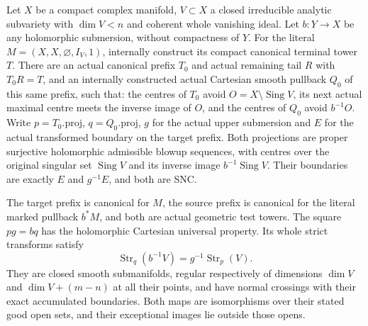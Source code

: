 \begin{theorem}
\label{hir:original-canonical-embedded-stopped-smooth-comparison}
\leanok
{}
Let $X$ be a compact complex manifold, $V\subset X$ a closed irreducible
analytic subvariety with $\dim V<n$ and coherent whole vanishing ideal.
Let $b:Y\to X$ be any holomorphic submersion, without compactness of $Y$.
For the literal $M=(X,X,\varnothing,I_V,1)$, internally construct its compact
canonical terminal tower $T$.  There are an actual canonical prefix $T_0$
and actual remaining tail $R$ with $T_0R=T$, and an internally constructed
actual Cartesian smooth pullback $Q_0$ of this same prefix, such that:
the centres of $T_0$ avoid $O=X\setminus\operatorname{Sing}V$, its next
actual maximal centre meets the inverse image of $O$, and the centres of
$Q_0$ avoid $b^{-1}O$.  Write $p=T_0.\mathrm{proj}$, $q=Q_0.\mathrm{proj}$,
$g$ for the actual upper submersion and $E$ for the actual transformed
boundary on the target prefix.  Both projections are proper surjective
holomorphic admissible blowup sequences, with centres over the original
singular set $\operatorname{Sing}V$ and its inverse image $b^{-1}\operatorname{Sing}V$.
Their boundaries are exactly $E$ and $g^{-1}E$, and both are SNC.

The target prefix is canonical for $M$, the source prefix is canonical
for the literal marked pullback $b^*M$, and both are actual geometric test
towers.  The square $pg=bq$ has the holomorphic Cartesian universal
property.  Its whole strict transforms satisfy
\[
 \operatorname{Str}_q(b^{-1}V)=g^{-1}\operatorname{Str}_p(V).
\]
They are closed smooth submanifolds, regular respectively of dimensions
$\dim V$ and $\dim V+(m-n)$ at all their points, and have normal crossings
with their exact accumulated boundaries.  Both maps are isomorphisms over
their stated good open sets, and their exceptional images lie outside
those opens.
\end{theorem}
